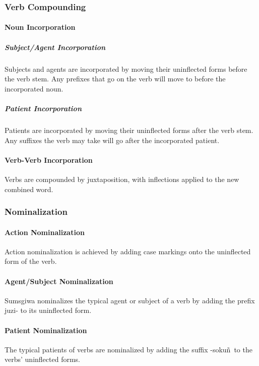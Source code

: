 \subsubsection{Verb Compounding}

\paragraph{Noun Incorporation}

\subparagraph{Subject/Agent Incorporation}
Subjects and agents are incorporated by moving their uninflected forms before the verb stem. Any prefixes that go on the verb will move to before the incorporated noun.

\subparagraph{Patient Incorporation}
Patients are incorporated by moving their uninflected forms after the verb stem. Any suffixes the verb may take will go after the incorporated patient.

\paragraph{Verb-Verb Incorporation}
Verbs are compounded by juxtaposition, with inflections applied to the new combined word.

\subsubsection{Nominalization}

\paragraph{Action Nominalization}
Action nominalization is achieved by adding case markings onto the uninflected form of the verb.

\paragraph{Agent/Subject Nominalization}
Sumsgiwa nominalizes the typical agent or subject of a verb by adding the prefix \textlangle juzi\textrangle- to its uninflected form.

\paragraph{Patient Nominalization}
The typical patients of verbs are nominalized by adding the suffix -\textlangle sokuñ\textrangle~to the verbs' uninflected forms.

